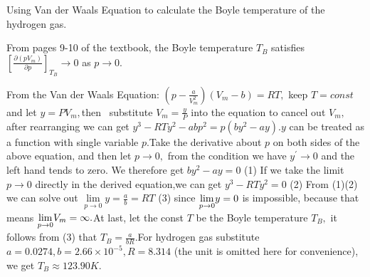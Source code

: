 \documentclass{article}
\begin{document}
Using Van der Waals Equation to calculate the Boyle temperature of the
hydrogen gas.

From pages 9-10 of the textbook, the Boyle temperature $T_{B}$ satisfies $%
\left[ \frac{\partial (pV_{m})}{\partial p}\right] _{T_{B}}\rightarrow 0$ as 
$p\rightarrow 0.$

From the Van der Waals Equation: $(p-\frac{a}{V_{m}^{2}})(V_{m}-b)=RT,$ keep 
$T=const$ and let $y=PV_{m},$then \qquad\ substitute $V_{m}=\frac{y}{P}$
into the equation to cancel out $V_{m},$ after rearranging we can get $%
y^{3}-RTy^{2}-abp^{2}=p(by^{2}-ay).y$ can be treated as a function with
single variable $p$.Take the derivative about $p$ on both sides of the above
equation, and then let $p\rightarrow 0,$ from the condition we have $%
y^{\prime }\rightarrow 0$ and the left hand tends to zero. We therefore get $%
by^{2}-ay=0$ (1) If we take the limit $p\rightarrow 0$ directly in the
derived equation,we can get $y^{3}-RTy^{2}=0$ (2) From (1)(2) we can solve
out $\underset{p\rightarrow 0}{\lim }y=\frac{a}{b}=RT$ (3) since $\underset{%
p\rightarrow 0}{\lim }y=0$ is impossible, because that means $\underset{%
p\rightarrow 0}{\lim }V_{m}=\infty .$At last, let the const $T$ be the Boyle
temperature $T_{B},$ it follows from (3) that $T_{B}=\frac{a}{bR}.$For
hydrogen gas substitute $a=0.0274,b=2.66\times 10^{-5},R=8.314$ (the unit is
omitted here for convenience), we get $T_{B}\approx 123.90K.$
\end{document}
